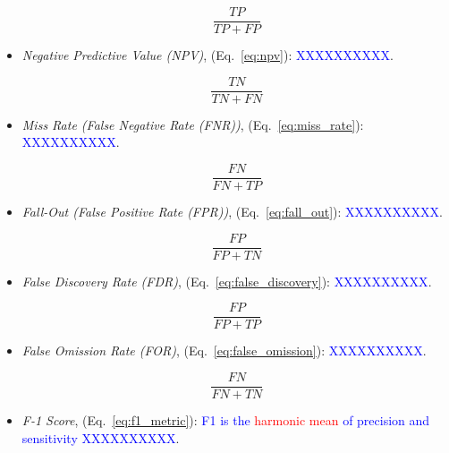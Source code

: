 \begin{itemize}
\begin{equation}
{\frac{TP}{TP+FP}}
\label{eq:precision}
\end{equation}

\item \textit{Negative Predictive Value (NPV)}, (Eq.~\ref{eq:npv}): \textcolor{blue}{XXXXXXXXXX}.

\begin{equation}
{\frac{TN}{TN+FN}}
\label{eq:npv}
\end{equation}

\item \textit{Miss Rate (False Negative Rate (FNR))}, (Eq.~\ref{eq:miss_rate}): \textcolor{blue}{XXXXXXXXXX}.

\begin{equation}
{\frac{FN}{FN+TP}}
\label{eq:miss_rate}
\end{equation}

\item \textit{Fall-Out (False Positive Rate (FPR))}, (Eq.~\ref{eq:fall_out}): \textcolor{blue}{XXXXXXXXXX}.

\begin{equation}
{\frac{FP}{FP+TN}}
\label{eq:fall_out}
\end{equation}

\item \textit{False Discovery Rate (FDR)}, (Eq.~\ref{eq:false_discovery}): \textcolor{blue}{XXXXXXXXXX}.

\begin{equation}
{\frac{FP}{FP+TP}}
\label{eq:false_discovery}
\end{equation}

\item \textit{False Omission Rate (FOR)}, (Eq.~\ref{eq:false_omission}): \textcolor{blue}{XXXXXXXXXX}.

\begin{equation}
{\frac{FN}{FN+TN}}
\label{eq:false_omission}
\end{equation}

\item \textit{F-1 Score}, (Eq.~\ref{eq:f1_metric}): \textcolor{blue}{F1 is the \textcolor{red}{harmonic mean} of precision and sensitivity XXXXXXXXXX}.


\end{itemize}
